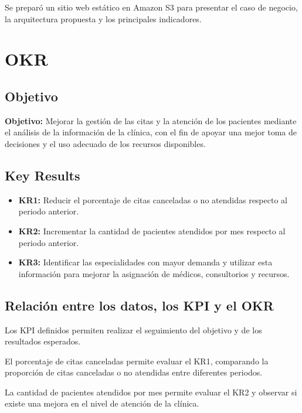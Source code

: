 \documentclass[11pt,letterpaper]{article}
\begin{document}
Se preparó un sitio web estático en Amazon S3 para presentar el caso de negocio, la arquitectura propuesta y los principales indicadores.

\section{OKR}

\subsection{Objetivo}

\textbf{Objetivo:} Mejorar la gestión de las citas y la atención de los pacientes mediante el análisis de la información de la clínica, 
con el fin de apoyar una mejor toma de decisiones y el uso adecuado de los recursos disponibles.

\subsection{Key Results}

\begin{itemize}
  \item \textbf{KR1:} Reducir el porcentaje de citas canceladas o no atendidas respecto al periodo anterior.

  \item \textbf{KR2:} Incrementar la cantidad de pacientes atendidos por mes respecto al periodo anterior.

  \item \textbf{KR3:} Identificar las especialidades con mayor demanda y utilizar esta información para mejorar la asignación de médicos, 
  consultorios y recursos.
\end{itemize}

\subsection{Relación entre los datos, los KPI y el OKR}

Los KPI definidos permiten realizar el seguimiento del objetivo y de los resultados esperados.

El porcentaje de citas canceladas permite evaluar el KR1, comparando la proporción de citas canceladas o no atendidas entre diferentes periodos.

La cantidad de pacientes atendidos por mes permite evaluar el KR2 y observar si existe una mejora en el nivel de atención de la clínica.
\end{document}

